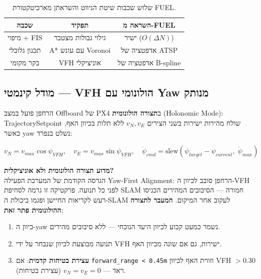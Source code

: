 \documentclass[11pt,a4paper]{article}
\begin{document}
\begin{table}[H]
\centering
\begin{tabular}{ccc}
\toprule
\textbf{שכבה} & \textbf{תפקיד} & \textbf{השראה מ-\textenglish{FUEL}} \\
\midrule
מיפוי + \textenglish{FIS} & גילוי גבולות מצטבר & ישיר ($O(\Delta N)$) \\
תכנון גלובלי & \textenglish{A*} עם עונש \textenglish{Voronoi} & אדפטציה של \textenglish{ATSP} \\
בקר מקומי & \textenglish{VFH} אוניציקלי & אדפטציה של \textenglish{B-spline} \\
\bottomrule
\end{tabular}
\caption{שלוש שכבות שיטת הניווט והשראתן מארכיטקטורת \textenglish{FUEL}.}
\label{tab:nav_layers}
\end{table}

\subsection{מודל קינמטי — \textenglish{VFH} הולונומי עם \textenglish{Yaw} מנותק}\label{sec:holonomic_model}

הרחפן פועל במצב \textenglish{Offboard} של \textenglish{PX4} ב\textbf{תצורה הולונומית} (\textenglish{Holonomic Mode}): \textenglish{TrajectorySetpoint} שולח מהירות ישירות בשני הצירים $v_N, v_E$ ללא תלות בכיוון האף, כאשר \textenglish{yaw} נשלט בנפרד:

\begin{equation}
v_N = v_{max}\cos\psi_{VFH}, \quad v_E = v_{max}\sin\psi_{VFH}, \quad \dot{\psi}_{cmd} = \text{slew}(\psi_{target} - \psi_{current},\; \dot{\psi}_{max})
\end{equation}

\textbf{מדוע תצורה הולונומית ולא אוניציקלית?} \\
הגרסה הקודמת של המערכת הפעילה \textenglish{Yaw-First Alignment}: הרחפן סובב לכיוון ה-VFH לפני כל תנועה. פרקטיקה זו גרמה לסחיפת SLAM חמורה — הסיבובים המהירים הכניסו רעש לקריאות החיישן ופגמו ביכולת ה-SLAM לעקוב אחר המיקום. \textbf{המעבר לתצורה ההולונומית פתר זאת}:
\begin{enumerate}
    \item כיוון ה-\textenglish{yaw} נשמר כמעט קבוע לכיוון היעד הנוכחי — ללא סיבובים מהירים.
    \item תנועה מבוצעת לכיוון שנבחר על ידי \textenglish{VFH} ישירות, גם אם שונה מכיוון האף.
    \item \textbf{עצירת בטיחות קדמית}: אם \texttt{forward\_range < 0.45m} וזווית האף לכיוון \textenglish{VFH} $> 0.30$ ראד — $v_N = v_E = 0$ (עצירת בטיחות).
\end{enumerate}
\end{document}
